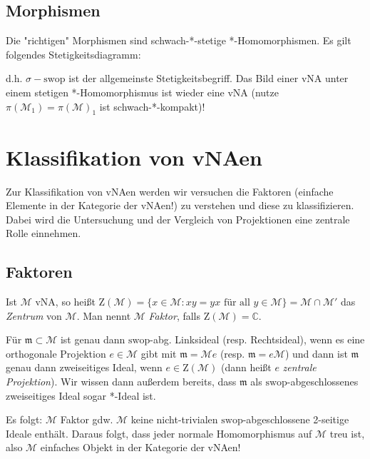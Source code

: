 \documentclass[11pt,a4paper]{scrartcl}
\newcommand{\C}{\mathbb{C}} %
\newcommand{\M}{\mathcal{M}}
\theoremstyle{plain}
\theoremstyle{definition}
\theoremstyle{remark}
\begin{document}
\subsection{Morphismen}

Die "richtigen" Morphismen sind schwach-*-stetige *-Homomorphismen. Es gilt folgendes Stetigkeitsdiagramm:

\begin{center}\end{center}

d.h. $\sigma-\mathrm{swop}$ ist der allgemeinste Stetigkeitsbegriff. Das Bild einer vNA unter einem stetigen *-Homomorphismus ist wieder eine vNA (nutze $\pi(\M_1)=\pi(\M)_1$ ist schwach-*-kompakt)!

\section{Klassifikation von vNAen}

Zur Klassifikation von vNAen werden wir versuchen die Faktoren (einfache Elemente in der Kategorie der vNAen!) zu verstehen und diese zu klassifizieren. Dabei wird die Untersuchung und der Vergleich von Projektionen eine zentrale Rolle einnehmen.

\subsection{Faktoren}

Ist $\M$ vNA, so heißt $\mathrm{Z}(\M)=\{x\in \M: xy=yx \text{ für all } y\in \M\}=\M\cap \M'$ das \emph{Zentrum} von $\M$. Man nennt $\M$ \emph{Faktor}, falls $\mathrm{Z}(\M)=\C$.

Für $\mathfrak{m}\subset\M$ ist genau dann $\mathrm{swop}$-abg. Linksideal (resp. Rechtsideal), wenn es eine orthogonale Projektion $e\in \M$ gibt mit $\mathfrak{m}=\M e$ (resp. $\mathfrak{m}=e\M$) und dann ist $\mathfrak{m}$ genau dann zweiseitiges Ideal, wenn $e\in \mathrm{Z}(\M)$ (dann heißt $e$ \emph{zentrale Projektion}). Wir wissen dann außerdem bereits, dass $\mathfrak{m}$ als $\mathrm{swop}$-abgeschlossenes zweiseitiges Ideal sogar *-Ideal ist.

Es folgt: $\M$ Faktor gdw. $\M$ keine nicht-trivialen $\mathrm{swop}$-abgeschlossene 2-seitige Ideale enthält. Daraus folgt, dass jeder normale Homomorphismus auf $\M$ treu ist, also $\M$ einfaches Objekt in der Kategorie der vNAen!
\end{document}
